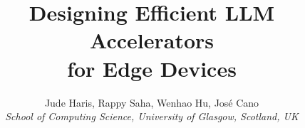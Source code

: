 \documentclass[10pt, conference]{IEEEtran}
\begin{document}



\title{Designing Efficient LLM Accelerators \\ for Edge Devices}



\author{Jude Haris, Rappy Saha, Wenhao Hu, Jos\'e Cano \\
\emph{School of Computing Science, University of Glasgow, Scotland, UK}
}





\maketitle

\end{document}

